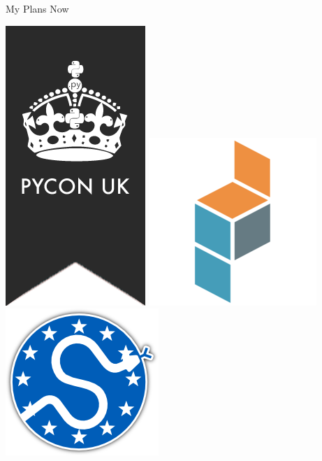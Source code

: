 \documentclass{beamer}
\begin{document}
\begin{frame}{My Plans Now}
    \begin{center}

        \includegraphics[height=0.25\textheight]{static/pyconuk.png}
        \hspace{2cm}
        \includegraphics[height=0.2\textheight]{static/pydata.jpeg}
        \hspace{1.5cm}
        \includegraphics[height=0.2\textheight]{static/euroscipy.png}


\end{center}
\end{frame}
\end{document}
